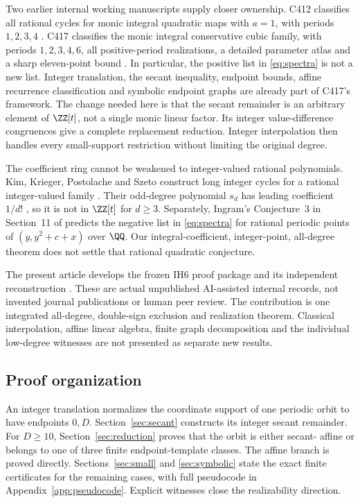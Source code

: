 Two earlier internal working manuscripts supply closer ownership.
C412 classifies all rational cycles for monic integral quadratic
maps with $a=1$, with periods $1,2,3,4$
\cite{C412Working}. C417 classifies the monic integral conservative
cubic family, with periods $1,2,3,4,6$, all positive-period
realizations, a detailed parameter atlas and a sharp eleven-point
bound \cite{C417Working}. In particular, the positive list in
\eqref{eq:spectra} is not a new list. Integer translation, the
secant inequality, endpoint bounds, affine recurrence classification
and symbolic endpoint graphs are already part of C417's framework.
The change needed here is that the secant remainder is an arbitrary
element of $\ZZ[t]$, not a single monic linear factor. Its integer
value-difference congruences give a complete replacement reduction.
Integer interpolation then handles every small-support restriction
without limiting the original degree.

The coefficient ring cannot be weakened to integer-valued rational
polynomials. Kim, Krieger, Postolache and Szeto construct long integer
cycles for a rational integer-valued family
\cite[Theorem~5.1]{KimEtAl2025}. Their odd-degree polynomial $s_d$
has leading coefficient $1/d!$ \cite[Section~4.1]{KimEtAl2025},
so it is not in $\ZZ[t]$ for $d\ge3$. Separately, Ingram's
Conjecture~3 in Section~11 of \cite{deHenon2024} predicts the
negative list in \eqref{eq:spectra} for rational periodic points
of $(y,y^2+c+x)$ over $\QQ$. Our integral-coefficient, integer-point,
all-degree theorem does not settle that rational quadratic conjecture.

The present article develops the frozen IH6 proof package
\cite{IH6Working} and its independent reconstruction
\cite{IH6Review}. These are actual unpublished AI-assisted internal
records, not invented journal publications or human peer review.
The contribution is one integrated all-degree, double-sign exclusion
and realization theorem. Classical interpolation, affine linear
algebra, finite graph decomposition and the individual low-degree
witnesses are not presented as separate new results.

\subsection{Proof organization}
An integer translation normalizes the coordinate support of one
periodic orbit to have endpoints $0,D$. Section~\ref{sec:secant}
constructs its integer secant remainder. For $D\ge10$,
Section~\ref{sec:reduction} proves that the orbit is either secant-
affine or belongs to one of three finite endpoint-template classes.
The affine branch is proved directly. Sections~\ref{sec:small} and
\ref{sec:symbolic} state the exact finite certificates for the
remaining cases, with full pseudocode in Appendix~\ref{app:pseudocode}.
Explicit witnesses close the realizability direction.
